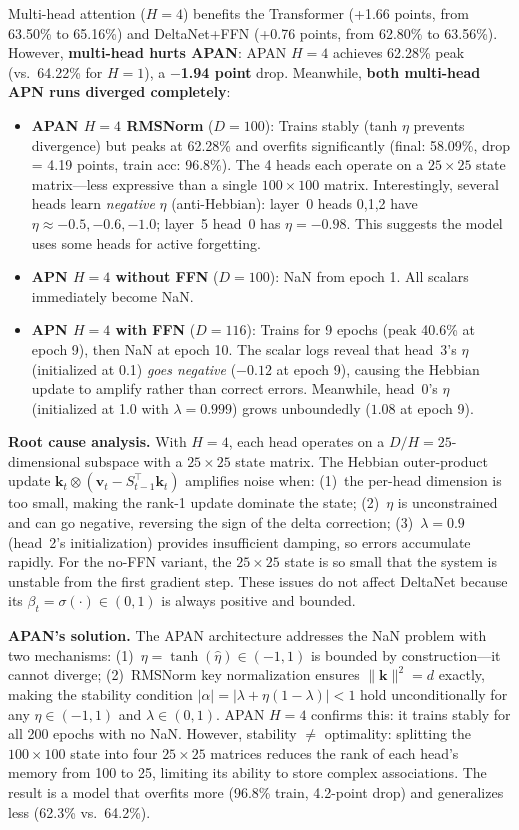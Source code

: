 \documentclass[11pt,a4paper]{article}
\begin{document}
Multi-head attention ($H{=}4$) benefits the Transformer (+1.66 points, from 63.50\% to 65.16\%) and DeltaNet+FFN (+0.76 points, from 62.80\% to 63.56\%).
However, \textbf{multi-head hurts APAN}: APAN $H{=}4$ achieves 62.28\% peak (vs.\ 64.22\% for $H{=}1$), a \textbf{$-$1.94 point} drop.
Meanwhile, \textbf{both multi-head APN runs diverged completely}:

\begin{itemize}
\item \textbf{APAN $H{=}4$ RMSNorm} ($D{=}100$): Trains stably (tanh $\eta$ prevents divergence) but peaks at 62.28\% and overfits significantly (final: 58.09\%, drop = 4.19 points, train acc: 96.8\%). The 4 heads each operate on a $25{\times}25$ state matrix---less expressive than a single $100{\times}100$ matrix. Interestingly, several heads learn \emph{negative} $\eta$ (anti-Hebbian): layer~0 heads 0,1,2 have $\eta \approx -0.5, -0.6, -1.0$; layer~5 head~0 has $\eta = -0.98$. This suggests the model uses some heads for active forgetting.
\item \textbf{APN $H{=}4$ without FFN} ($D{=}100$): NaN from epoch 1. All scalars immediately become NaN.
\item \textbf{APN $H{=}4$ with FFN} ($D{=}116$): Trains for 9 epochs (peak 40.6\% at epoch 9), then NaN at epoch 10. The scalar logs reveal that head~3's $\eta$ (initialized at 0.1) \emph{goes negative} ($-0.12$ at epoch 9), causing the Hebbian update to amplify rather than correct errors. Meanwhile, head~0's $\eta$ (initialized at 1.0 with $\lambda{=}0.999$) grows unboundedly ($1.08$ at epoch 9).
\end{itemize}

\textbf{Root cause analysis.} With $H{=}4$, each head operates on a $D/H = 25$-dimensional subspace with a $25 \times 25$ state matrix.
The Hebbian outer-product update $\mathbf{k}_t \otimes (\mathbf{v}_t - S_{t-1}^\top \mathbf{k}_t)$ amplifies noise when:
(1)~the per-head dimension is too small, making the rank-1 update dominate the state;
(2)~$\eta$ is unconstrained and can go negative, reversing the sign of the delta correction;
(3)~$\lambda{=}0.9$ (head~2's initialization) provides insufficient damping, so errors accumulate rapidly.
For the no-FFN variant, the $25{\times}25$ state is so small that the system is unstable from the first gradient step.
These issues do not affect DeltaNet because its $\beta_t = \sigma(\cdot) \in (0,1)$ is always positive and bounded.

\textbf{APAN's solution.} The APAN architecture addresses the NaN problem with two mechanisms: (1)~$\eta = \tanh(\hat\eta) \in (-1, 1)$ is bounded by construction---it cannot diverge; (2)~RMSNorm key normalization ensures $\|\mathbf{k}\|^2 = d$ exactly, making the stability condition $|\alpha| = |\lambda + \eta(1-\lambda)| < 1$ hold unconditionally for any $\eta \in (-1,1)$ and $\lambda \in (0,1)$.
APAN $H{=}4$ confirms this: it trains stably for all 200 epochs with no NaN.
However, stability $\ne$ optimality: splitting the $100{\times}100$ state into four $25{\times}25$ matrices reduces the rank of each head's memory from 100 to 25, limiting its ability to store complex associations.
The result is a model that overfits more (96.8\% train, 4.2-point drop) and generalizes less (62.3\% vs.\ 64.2\%).
\end{document}
